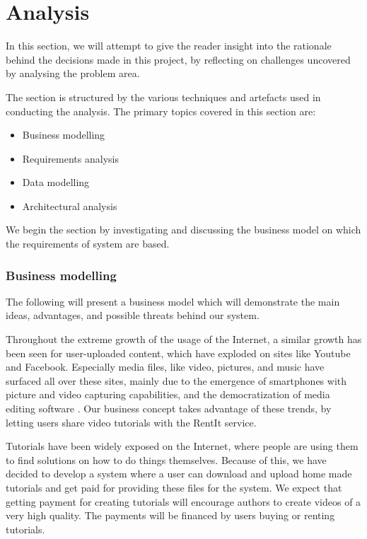 \part{Analysis}
In this section, we will attempt to give the reader insight into the rationale behind the decisions made in this project, by reflecting on challenges uncovered by analysing the problem area. 

The section is structured by the various techniques and artefacts used in conducting the analysis. The primary topics covered in this section are:
\begin{itemize}
\item Business modelling
\item Requirements analysis
\item Data modelling
\item Architectural analysis
\end{itemize}
We begin the section by investigating and discussing the business model on which the requirements of system are based.

\section{Business modelling} \label{BusinessModel}
The following will present a business model which will demonstrate the main ideas, advantages, and possible threats behind our system.

Throughout the extreme growth of the usage of the Internet, a similar growth has been seen for user-uploaded content, which have exploded on sites like Youtube and Facebook. Especially media files, like video, pictures, and music have surfaced all over these sites, mainly due to the emergence of smartphones with picture and video capturing capabilities, and the democratization of media editing software \cite{LL}. Our business concept takes advantage of these trends, by letting users share video tutorials with the RentIt service.

Tutorials have been widely exposed on the Internet, where people are using them to find solutions on how to do things themselves. Because of this, we have decided to develop a system where a user can download and upload home made tutorials and get paid for providing these files for the system. We expect that getting payment for creating tutorials will encourage authors to create videos of a very high quality. The payments will be financed by users buying or renting tutorials.

